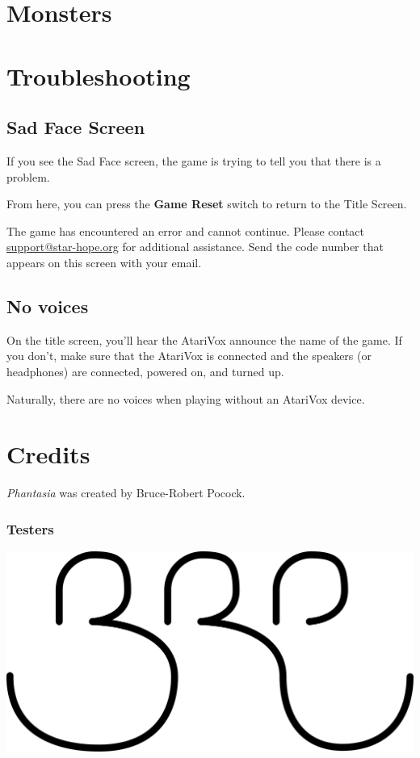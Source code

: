 \documentclass[10pt,twocolumn,openany,article]{memoir}
\begin{document}
\pagebreak
\chapter{Monsters}

\pagebreak
\chapter{Troubleshooting}

\section{Sad Face Screen}

If you  see the Sad  Face screen,  the game is  trying to tell  you that
there is a problem.

From here, you can press the \textbf{Game Reset} switch to return to the
Title Screen.

The game  has encountered an  error and cannot continue.  Please contact
\href{mailto:support@star-hope.org}{support@star-hope.org}           for
additional assistance. Send the code  number that appears on this screen
with your email.

\section{No voices}

On the title  screen, you'll hear the AtariVox announce  the name of the
game. If  you don't, make  sure that the  AtariVox is connected  and the
speakers (or headphones) are connected, powered on, and turned up.

Naturally,  there are  no  voices  when playing without an AtariVox device. 

\pagebreak
\chapter{Credits}


\textit{Phantasia} was created by Bruce-Robert  Pocock. 

\bigskip


\subsection{Testers}

\vfill


\begin{center}
  \includegraphics[width=.333\columnwidth]{../Manual/BRP.png}
\end{center}

\clearpage
{}
\thispagestyle{empty}
\end{document}
